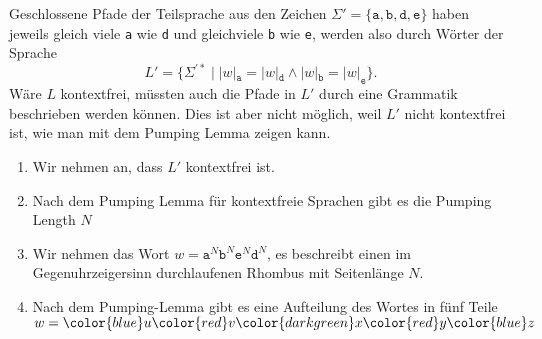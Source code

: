 \begin{loesung}
Geschlossene Pfade der Teilsprache aus den Zeichen
$\Sigma'=\{ \texttt{a}, \texttt{b}, \texttt{d}, \texttt{e} \}$
haben jeweils gleich viele \texttt{a} wie \texttt{d} 
und gleichviele \texttt{b} wie \texttt{e}, werden also durch
Wörter der Sprache
\begin{equation}
L'
=
\{
\Sigma^{\prime *}
\;|\;
|w|_{\texttt{a}}
=
|w|_{\texttt{d}}
\wedge
|w|_{\texttt{b}}
=
|w|_{\texttt{e}}
\}.
\end{equation}
Wäre $L$ kontextfrei, müssten auch die Pfade in $L'$ durch eine Grammatik
beschrieben werden können.
Dies ist aber nicht möglich, weil $L'$ nicht kontextfrei ist, wie man
mit dem Pumping Lemma zeigen kann.
\begin{enumerate}
\item
Wir nehmen an, dass $L'$ kontextfrei ist.
\item
Nach dem Pumping Lemma für kontextfreie Sprachen gibt es die
Pumping Length $N$
\item
Wir nehmen das Wort
$w= \texttt{a}^N \texttt{b}^N \texttt{e}^N \texttt{d}^N $,
es beschreibt einen im Gegenuhrzeigersinn durchlaufenen Rhombus
mit Seitenlänge $N$.
\item
Nach dem Pumping-Lemma gibt es eine Aufteilung des Wortes in
fünf Teile
$w=
{\color{blue}u}
{\color{red}v}
{\color{darkgreen}x}
{\color{red}y}
{\color{blue}z}$
\begin{center}
\end{center}
\end{enumerate}
\end{loesung}
